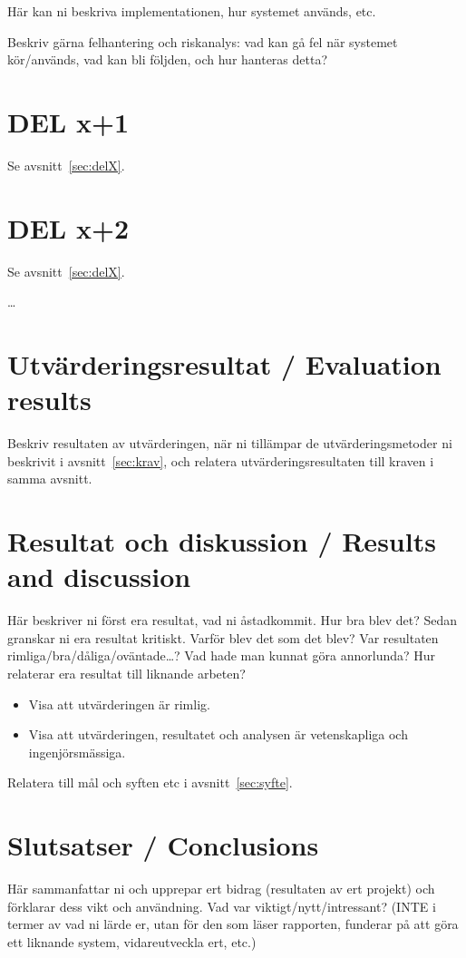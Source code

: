 \documentclass[a4paper,12pt]{article}
\begin{document}
Här kan ni beskriva implementationen, hur systemet används, etc.

Beskriv gärna felhantering och riskanalys: vad kan gå fel när systemet kör/används, vad kan bli följden, och hur hanteras detta?

\section{DEL x+1}
Se avsnitt~\ref{sec:delX}.
\section{DEL x+2}
Se avsnitt~\ref{sec:delX}.

\ldots

\section{Utvärderingsresultat / Evaluation results}
Beskriv resultaten av utvärderingen, när ni tillämpar de utvärderingsmetoder ni beskrivit i avsnitt~\ref{sec:krav}, och relatera utvärderingsresultaten till kraven i samma avsnitt.

\section{Resultat och diskussion / Results and discussion}
Här beskriver ni först era resultat, vad ni åstadkommit.  Hur bra blev det?
Sedan granskar ni era resultat kritiskt.  Varför blev det som det blev?  Var resultaten rimliga/bra/dåliga/o\-vän\-ta\-de\ldots?
Vad hade man kunnat göra annorlunda?  Hur relaterar era resultat till liknande arbeten?

\begin{itemize}
\item Visa att utvärderingen är rimlig.
\item Visa att utvärderingen, resultatet och analysen är vetenskapliga och ingenjörsmässiga.
\end{itemize}

Relatera till mål och syften etc i avsnitt~\ref{sec:syfte}.



\section{Slutsatser / Conclusions}
Här sammanfattar ni och upprepar ert bidrag (resultaten av ert projekt) och förklarar dess vikt och användning.  Vad var viktigt/nytt/intressant?  (INTE i termer av vad ni lärde er, utan för den som läser rapporten, funderar på att göra ett liknande system, vidareutveckla ert, etc.)
\end{document}
